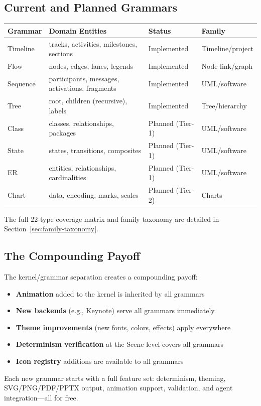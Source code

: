 \subsection{Current and Planned Grammars}

\begin{center}
\small
\begin{tabular}{llll}
\toprule
\textbf{Grammar} & \textbf{Domain Entities} & \textbf{Status} & \textbf{Family} \\
\midrule
Timeline & tracks, activities, milestones, sections & Implemented & Timeline/project \\
Flow & nodes, edges, lanes, legends & Implemented & Node-link/graph \\
Sequence & participants, messages, activations, fragments & Implemented & UML/software \\
Tree & root, children (recursive), labels & Implemented & Tree/hierarchy \\
\midrule
Class & classes, relationships, packages & Planned (Tier-1) & UML/software \\
State & states, transitions, composites & Planned (Tier-1) & UML/software \\
ER & entities, relationships, cardinalities & Planned (Tier-1) & UML/software \\
Chart & data, encoding, marks, scales & Planned (Tier-2) & Charts \\
\bottomrule
\end{tabular}
\end{center}

The full 22-type coverage matrix and family taxonomy are detailed in
Section~\ref{sec:family-taxonomy}.

\subsection{The Compounding Payoff}

The kernel/grammar separation creates a compounding payoff:

\begin{itemize}
  \item \textbf{Animation} added to the kernel is inherited by all grammars
  \item \textbf{New backends} (e.g., Keynote) serve all grammars immediately
  \item \textbf{Theme improvements} (new fonts, colors, effects) apply everywhere
  \item \textbf{Determinism verification} at the Scene level covers all grammars
  \item \textbf{Icon registry} additions are available to all grammars
\end{itemize}

Each new grammar starts with a full feature set: determinism, theming, SVG/PNG/PDF/PPTX output, animation support, validation, and agent integration---all for free.
